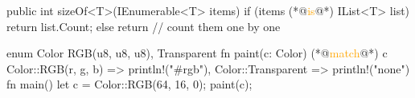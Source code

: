 \documentclass{article}
\begin{document}
\begin{lnSnippet}
public int sizeOf<T>(IEnumerable<T> items) {
  if (items (*@\textcolor{orange}{is}@*) IList<T> list) {
    return list.Count;
  } else {
    return // count them one by one
  }
}
\end{lnSnippet}
\begin{lnSnippet}
enum Color {
  RGB(u8, u8, u8),
  Transparent
}
fn paint(c: Color) {
  (*@\textcolor{orange}{match}@*) c {
    Color::RGB(r, g, b) =>
      println!("#{r}{g}{b}"),
    Color::Transparent =>
      println!("none")
  }
}
fn main() {
  let c = Color::RGB(64, 16, 0);
  paint(c);
}
\end{lnSnippet}

\end{document}
